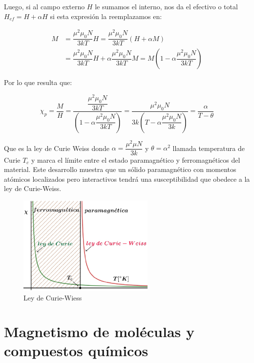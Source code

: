 Luego, si al campo externo $H$ le sumamos el interno, nos da el efectivo o total $H_{ef}=H+\alpha H$ si esta expresión la reemplazamos en:

\begin{equation}
\begin{aligned}
M &= \dfrac{\mu^{2}\mu_{0}N}{3kT}H =\dfrac{\mu^{2}\mu_{0}N}{3kT}(H+\alpha M) \\
  &= \dfrac{\mu^{2}\mu_{0}N}{3kT}H+ \alpha\dfrac{\mu^{2}\mu_{0}N}{3kT}M
  = M\left(1-\alpha\dfrac{\mu^{2}\mu_{0}N}{3kT} \right)
\end{aligned}
\end{equation}

Por lo que resulta que:

\begin{equation}
  \chi_{p}=\dfrac{M}{H}= \dfrac{\dfrac{\mu^{2}\mu_{0}N}{3kT}}{\left(1-\alpha\dfrac{\mu^{2}\mu_{0}N}{3kT} \right)}=\dfrac{\mu^{2}\mu_{0}N}{3k \left(T-\alpha\dfrac{\mu^{2}\mu_{0}N}{3k} \right)}= \dfrac{\alpha}{T-\theta}
\end{equation} 

Que es la ley de Curie Weiss donde $\alpha=\dfrac{\mu^{2}\mu N}{3k}$ y $\theta=\alpha^{2}$ llamada temperatura de Curie $T_{c}$ y marca el límite entre el estado paramagnético y ferromagnéticos del material. Este desarrollo muestra que un sólido paramagnético con momentos atómicos  localizados pero interactivos tendrá una susceptibilidad que obedece a la ley de Curie-Weiss.

\begin{figure}[H]
    \centering
    \includegraphics[width=0.6\textwidth]{./Figures/fig_c3}
	\caption{Ley de Curie-Wiess}
	\label{fig:c3}
\end{figure}

\section{Magnetismo de moléculas y compuestos químicos}

